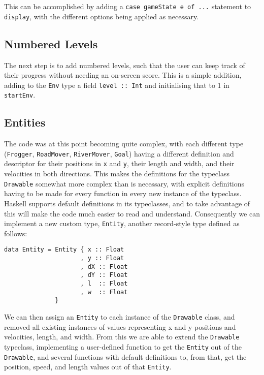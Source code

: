 \documentclass[12pt, a4paper]{report}
\begin{document}
This can be accomplished by adding a \verb|case gameState e of ...| statement to \verb|display|, with the different options being applied as necessary.

\subsection{Numbered Levels}

The next step is to add numbered levels, such that the user can keep track of their progress without needing an on-screen score.
This is a simple addition, adding to the \verb|Env| type a field \verb|level :: Int| and initialising that to 1 in \verb|startEnv|.

\subsection{Entities}

The code was at this point becoming quite complex, with each different type (\verb|Frogger|, \verb|RoadMover|, \verb|RiverMover|, \verb|Goal|) having a different definition and descriptor for their positions in \verb|x| and \verb|y|, their length and width, and their velocities in both directions.
This makes the definitions for the typeclass \verb|Drawable| somewhat more complex than is necessary, with explicit definitions having to be made for every function in every new instance of the typeclass.
Haskell supports default definitions in its typeclasses, and to take advantage of this will make the code much easier to read and understand.
Consequently we can implement a new custom type, \verb|Entity|, another record-style type defined as follows:

\begin{lstlisting}
data Entity = Entity { x :: Float
                     , y :: Float
                     , dX :: Float
                     , dY :: Float
                     , l  :: Float
                     , w  :: Float
              }

\end{lstlisting}

We can then assign an \verb|Entity| to each instance of the \verb|Drawable| class, and removed all existing instances of values representing x and y positions and velocities, length, and width.
From this we are able to extend the \verb|Drawable| typeclass, implementing a user-defined function to get the \verb|Entity| out of the \verb|Drawable|, and several functions with default definitions to, from that, get the position, speed, and length values out of that \verb|Entity|.
\end{document}
